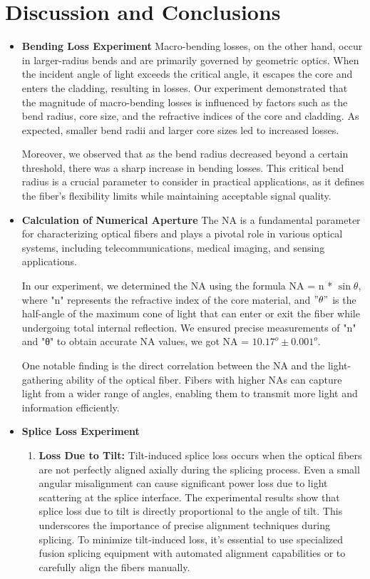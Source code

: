 \chapter{Discussion and Conclusions}%
\begin{itemize}
    \item \textbf{Bending Loss Experiment}
    Macro-bending losses, on the other hand, occur in larger-radius bends and are primarily governed by geometric optics. When the incident angle of light exceeds the critical angle, it escapes the core and enters the cladding, resulting in losses. Our experiment demonstrated that the magnitude of macro-bending losses is influenced by factors such as the bend radius, core size, and the refractive indices of the core and cladding. As expected, smaller bend radii and larger core sizes led to increased losses.

    Moreover, we observed that as the bend radius decreased beyond a certain threshold, there was a sharp increase in bending losses. This critical bend radius is a crucial parameter to consider in practical applications, as it defines the fiber's flexibility limits while maintaining acceptable signal quality.
    \item \textbf{Calculation of Numerical Aperture}
    The NA is a fundamental parameter for characterizing optical fibers and plays a pivotal role in various optical systems, including telecommunications, medical imaging, and sensing applications.

    In our experiment, we determined the NA using the formula NA = n * $\sin{\theta}$, where "n" represents the refractive index of the core material, and $"\theta"$ is the half-angle of the maximum cone of light that can enter or exit the fiber while undergoing total internal reflection. We ensured precise measurements of "n" and "θ" to obtain accurate NA values, we got NA = $10.17^{o} \pm 0.001^{o}$.

    One notable finding is the direct correlation between the NA and the light-gathering ability of the optical fiber. Fibers with higher NAs can capture light from a wider range of angles, enabling them to transmit more light and information efficiently. 
    
    \item \textbf{Splice Loss Experiment}
    \begin{enumerate}
        \item \textbf{Loss Due to Tilt:} Tilt-induced splice loss occurs when the optical fibers are not perfectly aligned axially during the splicing process. Even a small angular misalignment can cause significant power loss due to light scattering at the splice interface. The experimental results show that splice loss due to tilt is directly proportional to the angle of tilt. This underscores the importance of precise alignment techniques during splicing. To minimize tilt-induced loss, it's essential to use specialized fusion splicing equipment with automated alignment capabilities or to carefully align the fibers manually.


\end{enumerate}
\end{itemize}
